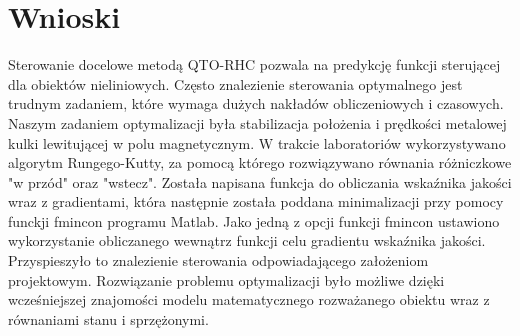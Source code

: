\section{Wnioski}

Sterowanie docelowe metodą QTO-RHC pozwala na predykcję funkcji sterującej dla obiektów nieliniowych. 
Często znalezienie sterowania optymalnego jest trudnym zadaniem, które wymaga dużych nakładów 
obliczeniowych i czasowych. Naszym zadaniem optymalizacji była stabilizacja położenia i prędkości metalowej
kulki lewitującej w polu magnetycznym. W trakcie laboratoriów wykorzystywano algorytm Rungego-Kutty, za 
pomocą którego rozwiązywano równania różniczkowe "w przód" oraz "wstecz". Została napisana funkcja do
obliczania wskaźnika jakości wraz z gradientami, która następnie została poddana minimalizacji przy pomocy
funckji fmincon programu Matlab. Jako jedną z opcji funkcji fmincon ustawiono wykorzystanie obliczanego 
wewnątrz funkcji celu gradientu wskaźnika jakości. Przyspieszyło to znalezienie sterowania odpowiadającego
założeniom projektowym. Rozwiązanie problemu optymalizacji było możliwe dzięki wcześniejszej znajomości
modelu matematycznego rozważanego obiektu wraz z równaniami stanu i sprzężonymi. 
